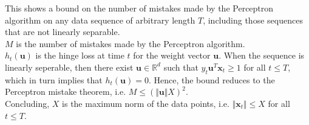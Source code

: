 \begin{itemize}
            This shows a bound on the number of mistakes made by the Perceptron algorithm on any data sequence of arbitrary length $T$, including those sequences that are not linearly separable.\\
            
            $M$ is the number of mistakes made by the Perceptron algorithm.\\
            $h_{t}(\boldsymbol{u})$ is the hinge loss at time $t$ for the weight vector $\boldsymbol{u}$. When the sequence is linearly seperable, then there exist $\boldsymbol{u} \in \mathbb{R}^d$ such that $y_{t} \boldsymbol{u}^T \boldsymbol{x}_{t} \geq 1$ for all $t \leq T$, which in turn implies that $h_{t}(\boldsymbol{u}) = 0$. Hence, the bound reduces to the Perceptron mistake theorem, i.e. $M \leq (\Vert \boldsymbol{u} \Vert X)^2$.\\
            Concluding, $X$ is the maximum norm of the data points, i.e. $\Vert \boldsymbol{x}_{t} \Vert \leq X$ for all $t \leq T$.
\end{itemize}
